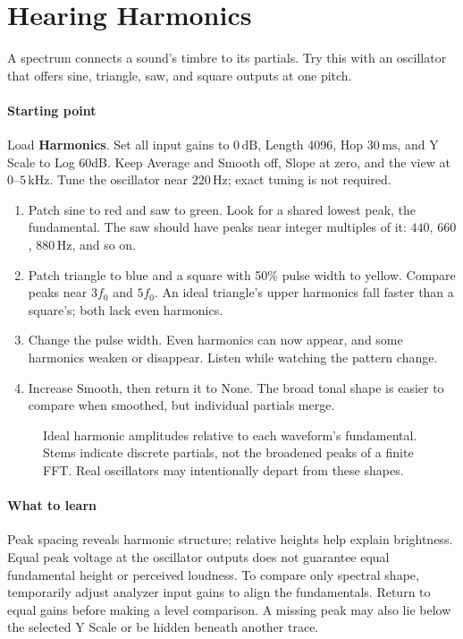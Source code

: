 \clearpage
\section{Hearing Harmonics}\label{sec:harmonics}

A spectrum connects a sound's timbre to its partials. Try this with an
oscillator that offers sine, triangle, saw, and square outputs at one pitch.

\paragraph{Starting point}
Load \textbf{Harmonics}. Set all input gains to $0\,\mathrm{dB}$, Length
4096, Hop $30\,\mathrm{ms}$, and Y Scale to Log 60dB. Keep Average and
Smooth off, Slope at zero, and the view at $0$--$5\,\mathrm{kHz}$.
Tune the oscillator near $220\,\mathrm{Hz}$; exact tuning is not required.

\begin{enumerate}
  \item Patch sine to red and saw to green. Look for a shared lowest peak,
  the fundamental. The saw should have peaks near integer multiples of it:
  $440$, $660$, $880\,\mathrm{Hz}$, and so on.
  \item Patch triangle to blue and a square with 50\% pulse width to yellow.
  Compare peaks near $3f_0$ and $5f_0$. An ideal triangle's upper harmonics
  fall faster than a square's; both lack even harmonics.
  \item Change the pulse width. Even harmonics can now appear, and some
  harmonics weaken or disappear. Listen while watching the pattern change.
  \item Increase Smooth, then return it to None. The broad tonal shape is
  easier to compare when smoothed, but individual partials merge.
\end{enumerate}

\begin{figure}[!htp]
\centering

\caption{Ideal harmonic amplitudes relative to each waveform's fundamental.
Stems indicate discrete partials, not the broadened peaks of a finite FFT.
Real oscillators may intentionally depart from these shapes.}
\end{figure}

\paragraph{What to learn}
Peak spacing reveals harmonic structure; relative heights help explain
brightness. Equal peak voltage at the oscillator outputs does not guarantee
equal fundamental height or perceived loudness. To compare only spectral
shape, temporarily adjust analyzer input gains to align the fundamentals.
Return to equal gains before making a level comparison. A missing peak may
also lie below the selected Y Scale or be hidden beneath another trace.

